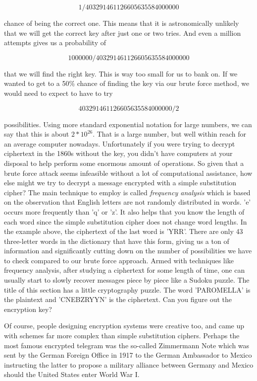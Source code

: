 \documentclass[UTF8]{book}
\begin{document}
\begin{CJK}{UTF8}{gbsn}
\[ 1/403291461126605635584000000 \]

chance of being the correct one. This means that it is astronomically unlikely that we will get the correct key after just one or two tries. And even a million attempts gives us a probability of

\[ 1000000/403291461126605635584000000 \]

that we will find the right key. This is way too small for us to bank on. If we wanted to get to a 50\% chance of finding the key via our brute force method, we would need to expect to have to try

\[ 403291461126605635584000000/2 \]

possibilities. Using more standard exponential notation for large numbers, we can say that this is about $2*10^{26}$. That is a large number, but well within reach for an average computer nowadays. Unfortunately if you were trying to decrypt ciphertext in the 1860s without the key, you didn't have computers at your disposal to help perform some enormous amount of operations. So given that a brute force attack seems infeasible without a lot of computational assistance, how else might we try to decrypt a message encrypted with a simple substitution cipher? The main technique to employ is called \emph{frequency analysis} which is based on the observation that English letters are not randomly distributed in words. 'e' occurs more frequently than 'q' or 'z'. It also helps that you know the length of each word since the simple substitution cipher does not change word lengths. In the example above, the ciphertext of the last word is 'YRR'. There are only 43 three-letter words in the dictionary that have this form, giving us a ton of information and significantly cutting down on the number of possibilities we have to check compared to our brute force approach. Armed with techniques like frequency analysis, after studying a ciphertext for some length of time, one can usually start to slowly recover messages piece by piece like a Sudoku puzzle. The title of this section has a little cryptography puzzle. The word 'PAROMELLA' is the plaintext and 'CNEBZRYYN' is the ciphertext. Can you figure out the encryption key?

Of course, people designing encryption systems were creative too, and came up with schemes far more complex than simple substitution ciphers. Perhaps the most famous encrypted telegram was the so-called Zimmermann Note which was sent by the German Foreign Office in 1917 to the German Ambassador to Mexico instructing the latter to propose a military alliance between Germany and Mexico should the United States enter World War I.


\end{CJK}
\end{document}
